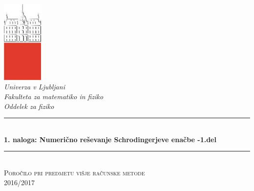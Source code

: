 \documentclass[slovene,11pt,a4paper]{article}
\numberwithin{equation}{section} %
\numberwithin{figure}{section} %
\numberwithin{table}{section} %
\begin{document}
\begin{titlepage}

\newcommand{\HRule}{\rule{\linewidth}{0.5mm}} %

\center %


 

\includegraphics[width=2cm]{slike/aaa}\\[0.5cm]
 
\textit{Univerza v Ljubljani}\\
\textit{Fakulteta za {\color{red}matematiko in fiziko}}\\[0.5cm]

\emph{Oddelek za fiziko}\\[0.5cm] %


\HRule \\[0.4cm]
\huge {\bfseries 1. naloga: Numerično reševanje Schrodingerjeve enačbe -1.del}\\[0.4cm] %
\HRule \\[0.5cm] 

 \textsc{\large Poročilo pri predmetu višje računske metode}\\
 \textsc{\large 2016/2017}\\[1cm] %
 

\end{titlepage}
\end{document}
